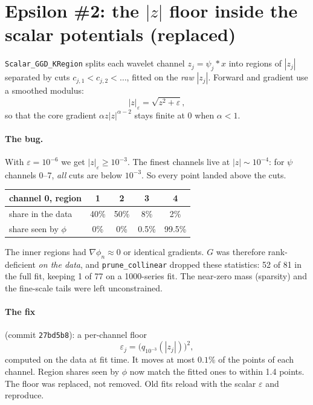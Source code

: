 \documentclass[11pt]{article}
\newcommand{\code}[1]{\texttt{#1}}
\begin{document}
\section{Epsilon \#2: the $|z|$ floor inside the scalar potentials (replaced)}

\code{Scalar\_GGD\_KRegion} splits each wavelet channel $z_j = \psi_j * x$ into
regions of $|z_j|$ separated by cuts $c_{j,1} < c_{j,2} < \dots$, fitted on the
\emph{raw} $|z_j|$. Forward and gradient use a smoothed modulus:
\[
  |z|_\varepsilon = \sqrt{z^2 + \varepsilon},
\]
so that the core gradient $\alpha z|z|^{\alpha-2}$ stays finite at $0$ when $\alpha<1$.

\paragraph{The bug.} With $\varepsilon = 10^{-6}$ we get $|z|_\varepsilon \ge 10^{-3}$.
The finest channels live at $|z| \sim 10^{-4}$: for $\psi$ channels 0--7, \emph{all}
cuts are below $10^{-3}$. So every point landed above the cuts.

\begin{center}
\begin{tabular}{lcccc}
\toprule
channel 0, region & 1 & 2 & 3 & 4\\
\midrule
share in the data      & 40\% & 50\% & 8\%   & 2\%\\
share seen by $\phi$   & 0\%  & 0\%  & 0.5\% & 99.5\%\\
\bottomrule
\end{tabular}
\end{center}

\noindent The inner regions had $\nabla\phi_n \approx 0$ or identical gradients. $G$ was
therefore rank-deficient \emph{on the data}, and \code{prune\_collinear} dropped these
statistics: 52 of 81 in the full fit, keeping 1 of 77 on a 1000-series fit. The
near-zero mass (sparsity) and the fine-scale tails were left unconstrained.

\paragraph{The fix} (commit \code{27bd5b8}): a per-channel floor
\[
  \varepsilon_j = \big(q_{10^{-3}}(|z_j|)\big)^2 ,
\]
computed on the data at fit time. It moves at most $0.1\%$ of the points of each channel.
Region shares seen by $\phi$ now match the fitted ones to within 1.4 points. The floor was
replaced, not removed. Old fits reload with the scalar $\varepsilon$ and reproduce.
\end{document}
